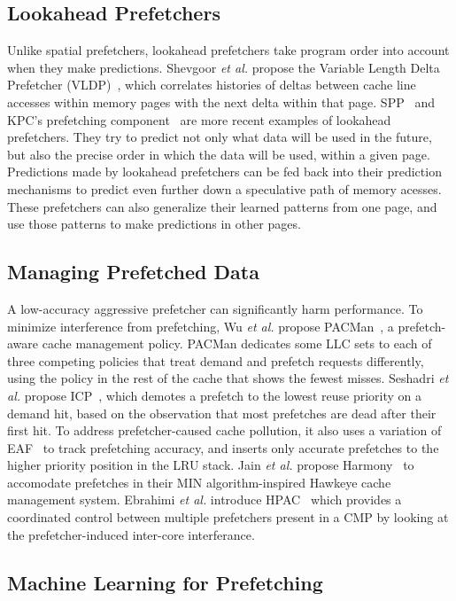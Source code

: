 \subsection{Lookahead Prefetchers}

Unlike spatial prefetchers, lookahead prefetchers take program order
into account when they make predictions.  Shevgoor \textit{et al.}
propose the Variable Length Delta Prefetcher (VLDP)~\cite{VLDP}, which
correlates histories of deltas between cache line accesses within
memory pages with the next delta within that page. SPP~\cite{SPP} and
KPC's prefetching component~\cite{KPC} are more recent examples of
lookahead prefetchers. They try to predict not only what data will be
used in the future, but also the precise order in which the data will
be used, within a given page. Predictions made by lookahead
prefetchers can be fed back into their prediction mechanisms to
predict even further down a speculative path of memory acesses. These
prefetchers can also generalize their learned patterns from one page,
and use those patterns to make predictions in other pages.

\subsection{Managing Prefetched Data}

A low-accuracy aggressive prefetcher can significantly harm
performance.  To minimize interference from prefetching, Wu \textit{et
  al.} propose PACMan~\cite{pacman}, a prefetch-aware cache management
policy. PACMan dedicates some LLC sets to each of three competing
policies that treat demand and prefetch requests differently, using
the policy in the rest of the cache that shows the fewest
misses. Seshadri \textit{et al.} propose ICP~\cite{icp}, which demotes
a prefetch to the lowest reuse priority on a demand hit, based on the
observation that most prefetches are dead after their first hit. To
address prefetcher-caused cache pollution, it also uses a variation of
EAF~\cite{eaf} to track prefetching accuracy, and inserts only
accurate prefetches to the higher priority position in the LRU
stack. Jain \textit{et al.} propose Harmony~\cite{Harmony} to
accomodate prefetches in their MIN algorithm-inspired Hawkeye cache
management system. Ebrahimi \textit{et al.} introduce
HPAC~\cite{HPAC} which provides a coordinated control between 
multiple prefetchers present in a CMP by looking at the 
prefetcher-induced inter-core interferance.

\subsection{Machine Learning for Prefetching}


